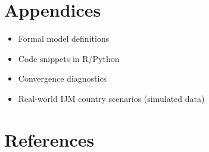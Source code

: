 \documentclass[
  12pt,
]{article}
\theoremstyle{plain}
\theoremstyle{definition}
\begin{document}
\section{Appendices}\label{appendices}

\begin{itemize}
\item
  Formal model definitions
\item
  Code snippets in R/Python
\item
  Convergence diagnostics
\item
  Real-world IJM country scenarios (simulated data)
\end{itemize}

\section*{References}\label{references}
\end{document}
